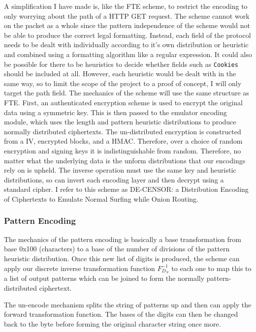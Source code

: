 \documentclass[ %
                    author={Samuel Russell},
                supervisor={Prof. Bogdan Warinschi},
                    degree={MEng},
                     title={Innocuous Ciphertexts},
                  subtitle={The DE-CENSOR Scheme},
                      type={research},
                      year={2018} ]{dissertation}
\begin{document}
A simplification I have made is, like the FTE scheme, to restrict the encoding to only worrying about the path of a HTTP GET request.
The scheme cannot work on the packet as a whole since the pattern independence of the scheme would not be able to produce the correct legal formatting.
Instead, each field of the protocol needs to be dealt with individually according to it's own distribution or heuristic and combined using a formatting algorithm like a regular expression.
It could also be possible for there to be heuristics to decide whether fields such as \texttt{Cookies} should be included at all.
However, each heuristic would be dealt with in the same way, so to limit the scope of the project to a proof of concept, I will only target the path field.
The mechanics of the scheme will use the same structure as FTE. First, an authenticated encryption scheme is used to encrypt the original data using a symmetric key.
This is then passed to the emulator encoding module, which uses the length and pattern heuristic distributions to produce normally distributed ciphertexts.
The un-distributed encryption is constructed from a IV, encrypted blocks, and a HMAC. Therefore, over a choice of random encryption and signing keys it is indistinguishable from random.
Therefore, no matter what the underlying data is the unform distributions that our encodings rely on is upheld. 
The inverse operation must use the same key and heuristic distributions, so can invert each encoding layer and then decrypt using a standard cipher.
I refer to this scheme as DE-CENSOR: a Distribution Encoding of Ciphertexts to Emulate Normal Surfing while Onion Routing.

\subsubsection{Pattern Encoding}

The mechanics of the pattern encoding is basically a base transformation from base 0x100 (characters) to a base of the number of divisions of the pattern heuristic distribution.
Once this new list of digits is produced, the scheme can apply our discrete inverse transformation function $F^{-1}_{D_N}$ to each one to map this to a list of output patterns which can be joined to form the normally pattern-distributed ciphertext.

The un-encode mechanism splits the string of patterns up and then can apply the forward transformation function. The bases of the digits can then be changed back to the byte before forming the original character string once more.
\end{document}
